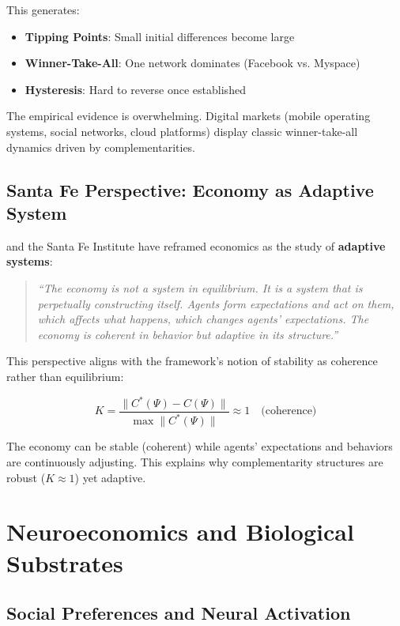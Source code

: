 \documentclass[12pt,oneside]{book}
\begin{document}
This generates:
\begin{itemize}
  \item \textbf{Tipping Points}: Small initial differences become large
  \item \textbf{Winner-Take-All}: One network dominates (Facebook vs. Myspace)
  \item \textbf{Hysteresis}: Hard to reverse once established
\end{itemize}

The empirical evidence is overwhelming. Digital markets (mobile operating systems, social networks,
cloud platforms) display classic winner-take-all dynamics driven by complementarities.

\section{Santa Fe Perspective: Economy as Adaptive System}

\citet{arthur2015} and the Santa Fe Institute have reframed economics as the study of
\textbf{adaptive systems}:

\begin{quote}
\textit{``The economy is not a system in equilibrium. It is a system that is perpetually
constructing itself. Agents form expectations and act on them, which affects what happens,
which changes agents' expectations. The economy is coherent in behavior but adaptive in its
structure.''}
\end{quote}

This perspective aligns with the framework's notion of stability as coherence rather than
equilibrium:

\begin{equation}
K = \frac{\|C^*(\Psi) - C(\Psi)\|}{\max\|C^*(\Psi)\|} \approx 1 \quad \text{(coherence)}
\end{equation}

The economy can be stable (coherent) while agents' expectations and behaviors are continuously
adjusting. This explains why complementarity structures are robust ($K \approx 1$) yet adaptive.

\chapter{Neuroeconomics and Biological Substrates}
\label{sec:neuroeconomics}

\section{Social Preferences and Neural Activation}
\end{document}

